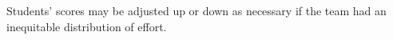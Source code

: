 
Students' scores may be adjusted up or down as necessary if the team had an inequitable distribution of effort.